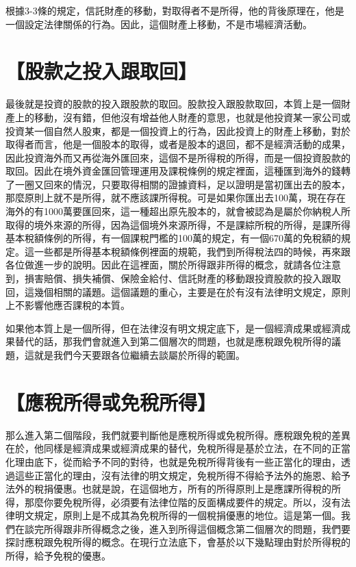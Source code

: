 \documentclass[]{ctexbook}
\begin{document}
根據3-3條的規定，信託財產的移動，對取得者不是所得，他的背後原理在，他是一個設定法律關係的行為。因此，這個財產上移動，不是市場經濟活動。

\hypertarget{ux80a1ux6b3eux4e4bux6295ux5165ux8ddfux53d6ux56de}{%
\section{【股款之投入跟取回】}\label{ux80a1ux6b3eux4e4bux6295ux5165ux8ddfux53d6ux56de}}

最後就是投資的股款的投入跟股款的取回。股款投入跟股款取回，本質上是一個財產上的移動，沒有錯，但他沒有增益他人財產的意思，也就是他投資某一家公司或投資某一個自然人股東，都是一個投資上的行為，因此投資上的財產上移動，對於取得者而言，他是一個股本的取得，或者是股本的退回，都不是經濟活動的成果，因此投資海外而又再從海外匯回來，這個不是所得稅的所得，而是一個投資股款的取回。因此在境外資金匯回管理運用及課稅條例的規定裡面，這種匯到海外的錢轉了一圈又回來的情況，只要取得相關的證據資料，足以證明是當初匯出去的股本，那麼原則上就不是所得，就不應該課所得稅。可是如果你匯出去100萬，現在存在海外的有1000萬要匯回來，這一種超出原先股本的，就會被認為是屬於你納稅人所取得的境外來源的所得，因為這個境外來源所得，不是課綜所稅的所得，是課所得基本稅額條例的所得，有一個課稅門檻的100萬的規定，有一個670萬的免稅額的規定。這一些都是所得基本稅額條例裡面的規範，我們到所得稅法四的時候，再來跟各位做進一步的說明。因此在這裡面，關於所得跟非所得的概念，就請各位注意到，損害賠償、損失補償、保險金給付、信託財產的移動跟投資股款的投入跟取回，這幾個相關的議題。這個議題的重心，主要是在於有沒有法律明文規定，原則上不影響他應否課稅的本質。

如果他本質上是一個所得，但在法律沒有明文規定底下，是一個經濟成果或經濟成果替代的話，那我們會就進入到第二個層次的問題，也就是應稅跟免稅所得的議題，這就是我們今天要跟各位繼續去談屬於所得的範圍。

\hypertarget{ux61c9ux7a05ux6240ux5f97ux6216ux514dux7a05ux6240ux5f97}{%
\section{【應稅所得或免稅所得】}\label{ux61c9ux7a05ux6240ux5f97ux6216ux514dux7a05ux6240ux5f97}}

那么進入第二個階段，我們就要判斷他是應稅所得或免稅所得。應稅跟免稅的差異在於，他同樣是經濟成果或經濟成果的替代，免稅所得是基於立法，在不同的正當化理由底下，從而給予不同的對待，也就是免稅所得背後有一些正當化的理由，透過這些正當化的理由，沒有法律的明文規定，免稅所得不得給予法外的施恩、給予法外的稅捐優惠。也就是說，在這個地方，所有的所得原則上是應課所得稅的所得，那麼你要免稅所得，必須要有法律位階的反面構成要件的規定。所以，沒有法律明文規定，原則上是不成其為免稅所得的一個稅捐優惠的地位。這是第一個。我們在談完所得跟非所得概念之後，進入到所得這個概念第二個層次的問題，我們要探討應稅跟免稅所得的概念。在現行立法底下，會基於以下幾點理由對於所得稅的所得，給予免稅的優惠。
\end{document}
